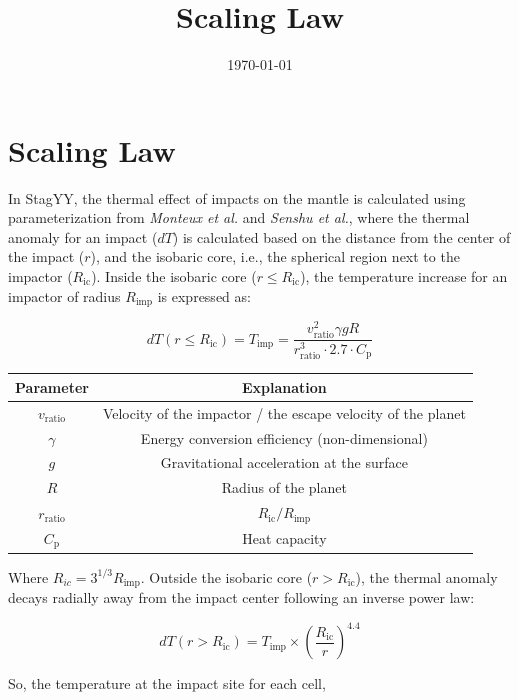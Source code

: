 \documentclass[12pt]{extarticle}
\title{Scaling Law}
\date{\today}
\begin{document}
\section{Scaling Law}

In StagYY, the thermal effect of impacts on the mantle is calculated using parameterization from \textit{Monteux et al.} and \textit{Senshu et al.}, where the thermal anomaly for an impact ($dT$) is calculated based on the distance from the center of the impact ($r$), and the isobaric core, i.e., the spherical region next to the impactor ($R_{\mathrm{ic}}$). Inside the isobaric core ($r \le R_{\mathrm{ic}}$), the temperature increase for an impactor of radius $R_{\mathrm{imp}}$ is expressed as:

\begin{equation} \label{dT_in}
   dT (r \le R_{\mathrm{ic}}) = T_{\mathrm{imp}} = \frac{v_{\mathrm{ratio}}^2 \gamma g R }{r_{\mathrm{ratio}}^3 \cdot 2.7 \cdot C_{\mathrm{p}}} 
\end{equation}

\begin{table}[hbt!]
\centering
\begin{tabular}{|c|c|}
\hline
Parameter & Explanation \\
\hline
$v_{\mathrm{ratio}}$ & Velocity of the impactor / the escape velocity of the planet \\
$\gamma$ & Energy conversion efficiency (non-dimensional) \\
$g$ & Gravitational acceleration at the surface \\
$R$ & Radius of the planet \\
$r_{\mathrm{ratio}}$ & $R_{\mathrm{ic}}/R_{\mathrm{imp}}$ \\
$C_{\mathrm{p}}$ & Heat capacity \\

\hline
\end{tabular}
\end{table}

Where $R_{ic} = 3^{1/3} R_{\mathrm{imp}}$. Outside the isobaric core ($r>R_{\mathrm{ic}}$), the thermal anomaly decays radially away from the impact center following an inverse power law:


\begin{equation} \label{dT_out}
    dT(r > R_{\mathrm{ic}}) = T_{\mathrm{imp}} \times \left(\frac{R_{\mathrm{ic}}}{r}\right)^{4.4}
\end{equation}

So, the temperature at the impact site for each cell,
\end{document}
